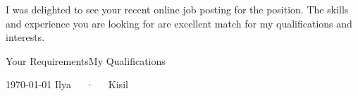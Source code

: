 \documentclass[11pt, a4paper]{ilyakisil-cv}
\begin{document}
\makecvheader[R]

\makelettertitle

\begin{cvletter}

    \lorem


    \lorem

    I was delighted to see your recent online job posting for the \fillme position. The skills and experience you are looking for are excellent match for my qualifications and interests.

    \begin{lettermatchitems}{Your Requirements}{My Qualifications}
            {%
                \lorem
            }
            {%
                \lorem
            }
    \end{lettermatchitems}

\end{cvletter}

\makeletterclosing

\makecvfooter
  {\today}
  {Ilya~~~·~~~Kisil}
  {\thepage}
\end{document}

